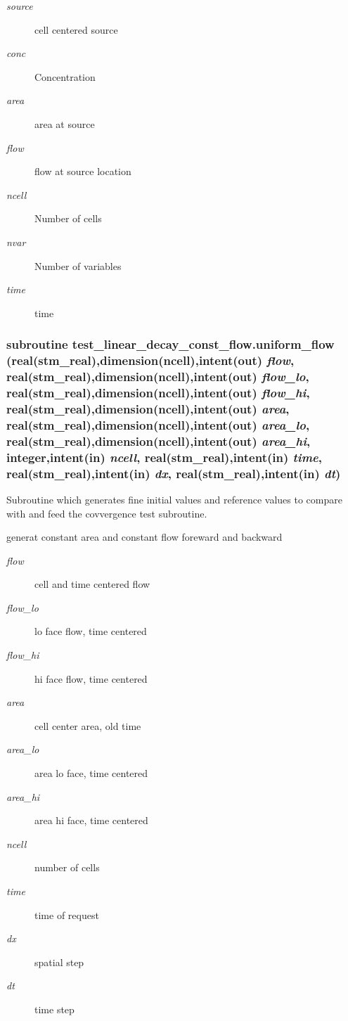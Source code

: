 \begin{Desc}
\item[Parameters:]
\begin{description}
\item[{\em source}]cell centered source \item[{\em conc}]Concentration\item[{\em area}]area at source \item[{\em flow}]flow at source location\item[{\em ncell}]Number of cells\item[{\em nvar}]Number of variables\item[{\em time}]time \end{description}
\end{Desc}
\hypertarget{a00088_062d78f13f8d4309047d345fa3c59f8d}{
\subsubsection[{uniform\_\-flow}]{\setlength{\rightskip}{0pt plus 5cm}subroutine test\_\-linear\_\-decay\_\-const\_\-flow.uniform\_\-flow (real(stm\_\-real),dimension(ncell),intent(out) {\em flow}, \/  real(stm\_\-real),dimension(ncell),intent(out) {\em flow\_\-lo}, \/  real(stm\_\-real),dimension(ncell),intent(out) {\em flow\_\-hi}, \/  real(stm\_\-real),dimension(ncell),intent(out) {\em area}, \/  real(stm\_\-real),dimension(ncell),intent(out) {\em area\_\-lo}, \/  real(stm\_\-real),dimension(ncell),intent(out) {\em area\_\-hi}, \/  integer,intent(in) {\em ncell}, \/  real(stm\_\-real),intent(in) {\em time}, \/  real(stm\_\-real),intent(in) {\em dx}, \/  real(stm\_\-real),intent(in) {\em dt})}}
\label{a00088_062d78f13f8d4309047d345fa3c59f8d}


Subroutine which generates fine initial values and reference values to compare with and feed the covvergence test subroutine. 

generat constant area and constant flow foreward and backward \begin{Desc}
\item[Parameters:]
\begin{description}
\item[{\em flow}]cell and time centered flow\item[{\em flow\_\-lo}]lo face flow, time centered\item[{\em flow\_\-hi}]hi face flow, time centered\item[{\em area}]cell center area, old time\item[{\em area\_\-lo}]area lo face, time centered\item[{\em area\_\-hi}]area hi face, time centered\item[{\em ncell}]number of cells\item[{\em time}]time of request\item[{\em dx}]spatial step\item[{\em dt}]time step \end{description}
\end{Desc}
